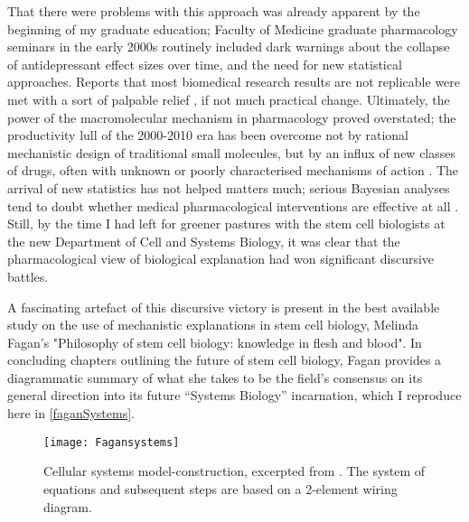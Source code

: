 That there were problems with this approach was already apparent by the beginning of my graduate education; Faculty of Medicine graduate pharmacology seminars in the early 2000s routinely included dark warnings about the collapse of antidepressant effect sizes over time, and the need for new statistical approaches. Reports that most biomedical research results are not replicable were met with a sort of palpable relief \cite{Ioannidis2005}, if not much practical change. Ultimately, the power of the macromolecular mechanism in pharmacology proved overstated; the productivity lull of the 2000-2010 era has been overcome not by rational mechanistic design of traditional small molecules, but by an influx of new classes of drugs, often with unknown or poorly characterised mechanisms of action \cite{Munos2019}. The arrival of new statistics has not helped matters much; serious Bayesian analyses tend to doubt whether medical pharmacological interventions are effective at all \cite{Stegenga2018}. Still, by the time I had left for greener pastures with the stem cell biologists at the new Department of Cell and Systems Biology, it was clear that the pharmacological view of biological explanation had won significant discursive battles.

A fascinating artefact of this discursive victory is present in the best available study on the use of mechanistic explanations in stem cell biology, Melinda Fagan's "Philosophy of stem cell biology: knowledge in flesh and blood". In concluding chapters outlining the future of stem cell biology, Fagan provides a diagrammatic summary of what she takes to be the field's consensus on its general direction into its future ``Systems Biology'' incarnation, which I reproduce here in \autoref{faganSystems}.


\begin{wrapfigure}{l}{0.4\textwidth}
\texttt{[image: Fagansystems]}
\caption{Cellular systems model-construction, excerpted from \cite[p.7]{Fagan2015}. The system of equations and subsequent steps are based on a 2-element wiring diagram.}
\label{fig:faganSystems}
\end{wrapfigure}


